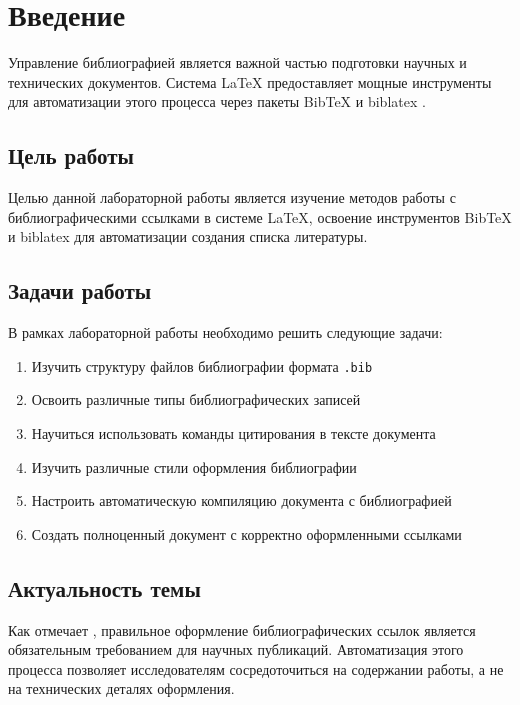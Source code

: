 \documentclass[12pt, a4paper]{article}
\begin{document}
\tableofcontents
\newpage

\section{Введение}

Управление библиографией является важной частью подготовки научных и технических документов. Система LaTeX предоставляет мощные инструменты для автоматизации этого процесса через пакеты BibTeX и biblatex \parencite{latex-project}.

\subsection{Цель работы}

Целью данной лабораторной работы является изучение методов работы с библиографическими ссылками в системе LaTeX, освоение инструментов BibTeX и biblatex для автоматизации создания списка литературы.

\subsection{Задачи работы}

В рамках лабораторной работы необходимо решить следующие задачи:

\begin{enumerate}
  \item Изучить структуру файлов библиографии формата \texttt{.bib}
  \item Освоить различные типы библиографических записей
  \item Научиться использовать команды цитирования в тексте документа
  \item Изучить различные стили оформления библиографии
  \item Настроить автоматическую компиляцию документа с библиографией
  \item Создать полноценный документ с корректно оформленными ссылками
\end{enumerate}

\subsection{Актуальность темы}

Как отмечает \textcite{lamport1994}, правильное оформление библиографических ссылок является обязательным требованием для научных публикаций. Автоматизация этого процесса позволяет исследователям сосредоточиться на содержании работы, а не на технических деталях оформления.
\end{document}
